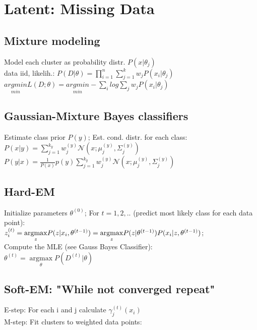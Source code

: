 \section*{Latent: Missing Data}
\subsection*{Mixture modeling}
Model each cluster as probability distr. $P(x|\theta_j)$\\
data iid, likelih.: $P(D|\theta) = \prod_{i=1}^n \sum_{j=1}^k w_j P(x_i|\theta_j)$\\
$\underset{min}{argmin}L(D;\theta) = \underset{min}{argmin} - \sum_i log \sum_j w_j P(x_i| \theta_j)$

\subsection*{Gaussian-Mixture Bayes classifiers}
Estimate class prior $P(y)$; Est. cond. distr. for each class:
$P(x|y) = \sum_{j=1}^{k_y} w_j^{(y)} \mathcal{N}(x; \mu_j^{(y)}, \Sigma_j^{(y)})$\\
$P(y|x) = \frac{1}{P(x)} p(y) \sum_{j=1}^{k_y} w_j^{(y)} \mathcal{N}(x; \mu_j^{(y)}, \Sigma_j^{(y)})$

\subsection*{Hard-EM}
Initialize parameters $\theta^{(0)}$; For $t=1,2,..$ (predict most likely class for each data point):\\
$z_i^{(t)} = \underset{z}{\operatorname{argmax}} P(z|x_i, \theta^{(t-1)})\\
= \underset{z}{\operatorname{argmax}} P(z|\theta^{(t-1)}) P(x_i|z,\theta^{(t-1)})$;\\
Compute the MLE (see Gauss Bayes Classifier):\\
$\theta^{(t)} = \underset{\theta}{\operatorname{argmax}} P(D^{(t)}|\theta)$

\subsection*{Soft-EM: "While not converged repeat"}
E-step: For each i and j calculate $\gamma_j^{(t)}(x_i)$\\
M-step: Fit clusters to weighted data points:\\

